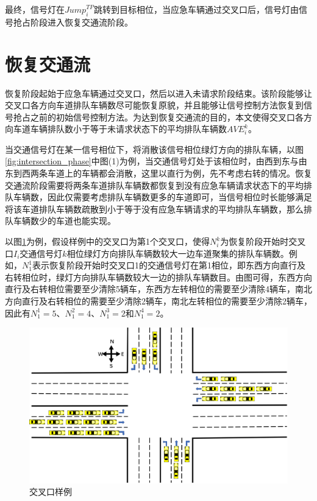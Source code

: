 最终，信号灯在${{Jump}_i^{TP}}$跳转到目标相位，当应急车辆通过交叉口后，信号灯由信号抢占阶段进入恢复交通流阶段。


\newpage

\section{恢复交通流}
恢复阶段起始于应急车辆通过交叉口，然后以进入未请求阶段结束。该阶段能够让交叉口各方向车道排队车辆数尽可能恢复原貌，并且能够让信号控制方法恢复到信号抢占之前的初始信号控制方法。为达到恢复交通流的目的，本文使得交叉口各方向车道车辆排队数小于等于未请求状态下的平均排队车辆数${AVE_i^k}$。

当交通信号灯在某一信号相位下，将消散该信号相位绿灯方向的排队车辆，以图\ref{fig:intersection_phase}中图(1)为例，当交通信号灯处于该相位时，由西到东与由东到西两条车道上的车辆都会消散，这里以直行为例，先不考虑右转的情况。恢复交通流阶段需要将两条车道排队车辆数都恢复到没有应急车辆请求状态下的平均排队车辆数，因此仅需要考虑排队车辆数更多的车道即可，当信号相位时长能够满足将该车道排队车辆数疏散到小于等于没有应急车辆请求的平均排队车辆数，那么排队车辆数少的车道也能实现。

以图\ref{fig:ave_i_k}为例，假设样例中的交叉口为第1个交叉口，使得${N_i^k}$为恢复阶段开始时交叉口${I_i}$交通信号灯${k}$相位绿灯方向排队车辆数较大一边车道聚集的排队车辆数。例如，${N_1^1}$表示恢复阶段开始时交叉口1的交通信号灯在第1相位，即东西方向直行及右转相位时，绿灯方向排队车辆数较大一边的排队车辆数目。由图可得，东西方向直行及右转相位需要至少清除5辆车，东西方左转相位的需要至少清除4辆车，南北方向直行及右转相位的需要至少清除2辆车，南北左转相位的需要至少清除2辆车，因此有${N_1^1}=5$、${N_1^2}=4$、${N_1^3}=2$和${N_1^4}=2$。

\begin{figure}[H]
	\centering
	\includegraphics[width=\textwidth]{figures/nik.png}
	\caption{交叉口样例}
	\label{fig:ave_i_k}
\end{figure}

